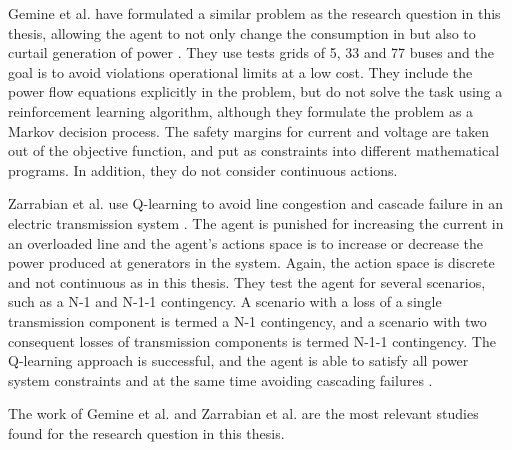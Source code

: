 \documentclass[class=book, crop=false, 11pt]{standalone}
\begin{document}
Gemine et al. have formulated a similar problem as the research question in this thesis, allowing the agent to not only change the consumption in but also to curtail generation of power \cite{active_network_management}. They use tests grids of 5, 33 and 77 buses and the goal is to avoid violations operational limits at a low cost. They include the power flow equations explicitly in the problem, but do not solve the task using a reinforcement learning algorithm, although they formulate the problem as a Markov decision process. The safety margins for current and voltage are taken out of the objective function, and put as constraints into different mathematical programs. In addition, they do not consider continuous actions.

Zarrabian et al. use Q-learning to avoid line congestion and cascade failure in an electric transmission system \cite{zarrabian2016reinforcement}. The agent is punished for increasing the current in an overloaded line and the agent's actions space is to increase or decrease the power produced at generators in the system. Again, the action space is discrete and not continuous as in this thesis. They test the agent for several scenarios, such as a N-1 and N-1-1 contingency. A scenario with a loss of a single transmission component is termed a N-1 contingency, and a scenario with two consequent losses of transmission components is termed N-1-1 contingency. The Q-learning approach is successful, and the agent is able to satisfy all power system constraints and at the same time avoiding cascading failures \cite{zarrabian2016reinforcement}. 


The work of Gemine et al. and Zarrabian et al. are the most relevant studies found for the research question in this thesis. 
\end{document}
